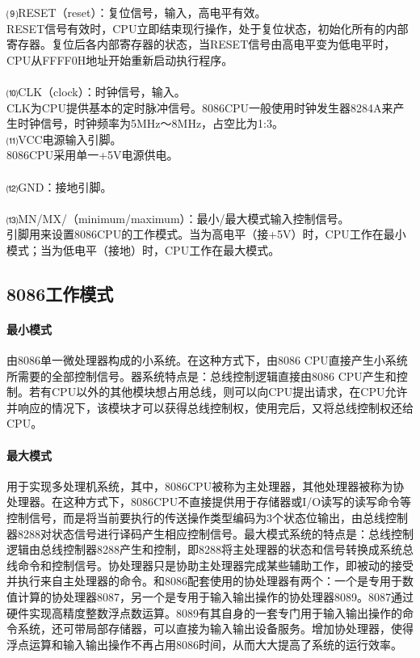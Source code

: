 \documentclass[12pt]{article}
\begin{document}
⑼RESET（reset）：复位信号，输入，高电平有效。\\
RESET信号有效时，CPU立即结束现行操作，处于复位状态，初始化所有的内部寄存器。复位后各内部寄存器的状态，当RESET信号由高电平变为低电平时，CPU从FFFF0H地址开始重新启动执行程序。\\\\
⑽CLK（clock）：时钟信号，输入。\\
CLK为CPU提供基本的定时脉冲信号。8086CPU一般使用时钟发生器8284A来产生时钟信号，时钟频率为5MHz～8MHz，占空比为1:3。\\
⑾VCC电源输入引脚。\\
8086CPU采用单一+5V电源供电。\\\\
⑿GND：接地引脚。\\\\
⒀MN/MX/（minimum/maximum）：最小/最大模式输入控制信号。\\
引脚用来设置8086CPU的工作模式。当为高电平（接+5V）时，CPU工作在最小模式；当为低电平（接地）时，CPU工作在最大模式。
\subsection{8086工作模式}
\paragraph{最小模式}
由8086单一微处理器构成的小系统。在这种方式下，由8086 CPU直接产生小系统所需要的全部控制信号。器系统特点是：总线控制逻辑直接由8086 CPU产生和控制。若有CPU以外的其他模块想占用总线，则可以向CPU提出请求，在CPU允许并响应的情况下，该模块才可以获得总线控制权，使用完后，又将总线控制权还给CPU。
\paragraph{最大模式}
用于实现多处理机系统，其中，8086CPU被称为主处理器，其他处理器被称为协处理器。在这种方式下，8086CPU不直接提供用于存储器或I/O读写的读写命令等控制信号，而是将当前要执行的传送操作类型编码为3个状态位输出，由总线控制器8288对状态信号进行译码产生相应控制信号。最大模式系统的特点是：总线控制逻辑由总线控制器8288产生和控制，即8288将主处理器的状态和信号转换成系统总线命令和控制信号。协处理器只是协助主处理器完成某些辅助工作，即被动的接受并执行来自主处理器的命令。和8086配套使用的协处理器有两个：一个是专用于数值计算的协处理器8087，另一个是专用于输入输出操作的协处理器8089。8087通过硬件实现高精度整数浮点数运算。8089有其自身的一套专门用于输入输出操作的命令系统，还可带局部存储器，可以直接为输入输出设备服务。增加协处理器，使得浮点运算和输入输出操作不再占用8086时间，从而大大提高了系统的运行效率。
\end{document}
